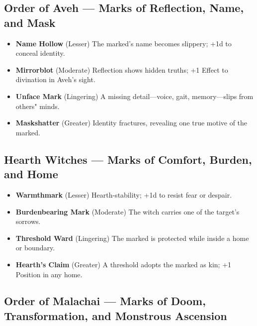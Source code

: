 \documentclass[11pt]{book}
\begin{document}
\subsection*{Order of Aveh --- Marks of Reflection, Name, and Mask}

\begin{itemize}[leftmargin=1.5em]
    \item \textbf{Name Hollow} (Lesser)  
    The marked's name becomes slippery; +1d to conceal identity.

    \item \textbf{Mirrorblot} (Moderate)  
    Reflection shows hidden truths; +1 Effect to divination in Aveh's sight.

    \item \textbf{Unface Mark} (Lingering)  
    A missing detail---voice, gait, memory---slips from others" minds.

    \item \textbf{Maskshatter} (Greater)  
    Identity fractures, revealing one true motive of the marked.
\end{itemize}

\subsection*{Hearth Witches --- Marks of Comfort, Burden, and Home}

\begin{itemize}[leftmargin=1.5em]
    \item \textbf{Warmthmark} (Lesser)  
    Hearth-stability; +1d to resist fear or despair.

    \item \textbf{Burdenbearing Mark} (Moderate)  
    The witch carries one of the target's sorrows.

    \item \textbf{Threshold Ward} (Lingering)  
    The marked is protected while inside a home or boundary.

    \item \textbf{Hearth's Claim} (Greater)  
    A threshold adopts the marked as kin; +1 Position in any home.
\end{itemize}

\subsection*{Order of Malachai --- Marks of Doom, Transformation, and Monstrous Ascension}
\end{document}
